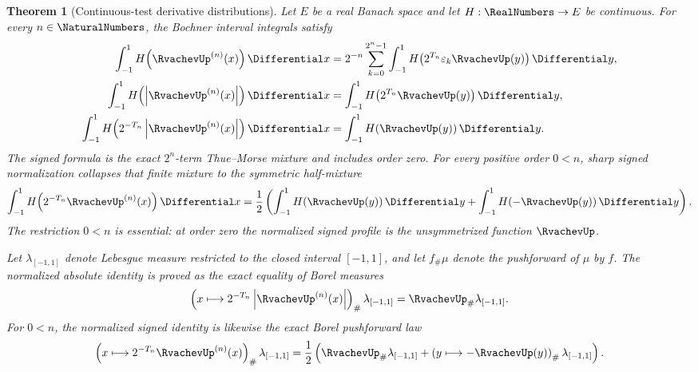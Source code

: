 \documentclass[11pt,oneside]{article}
\newtheorem{theorem}{Theorem}[section]
\theoremstyle{definition}
\theoremstyle{remark}
\begin{document}
\begin{theorem}[Continuous-test derivative distributions]
\label{thm:rvachev-derivative-continuous-tests}
Let \(E\) be a real Banach space and let \(H:\RealNumbers\to E\) be continuous.  For every
\(n\in\NaturalNumbers\), the Bochner interval integrals satisfy
\begin{align}
 \int_{-1}^{1}H\!\left(\RvachevUp^{(n)}(x)\right)\Differential x
 &=
 2^{-n}\sum_{k=0}^{2^n-1}
 \int_{-1}^{1}H\!\left(2^{T_n}\varepsilon_k\RvachevUp(y)\right)\Differential y,
                                                               \label{eq:rvachev-signed-mixture}\\
 \int_{-1}^{1}H\!\left(\left|\RvachevUp^{(n)}(x)\right|\right)\Differential x
 &=
 \int_{-1}^{1}H\!\left(2^{T_n}\RvachevUp(y)\right)\Differential y,
                                                               \label{eq:rvachev-absolute-test}\\
 \int_{-1}^{1}H\!\left(2^{-T_n}\left|\RvachevUp^{(n)}(x)\right|\right)\Differential x
 &=
 \int_{-1}^{1}H\!\left(\RvachevUp(y)\right)\Differential y.                    \label{eq:rvachev-normalized-test}
\end{align}
The signed formula is the exact \(2^n\)-term Thue--Morse mixture and includes order zero.
For every positive order \(0<n\), sharp signed normalization collapses that finite
mixture to the symmetric half-mixture
\begin{equation}
 \int_{-1}^{1}H\!\left(2^{-T_n}\RvachevUp^{(n)}(x)\right)\Differential x
 =\frac12\left(
   \int_{-1}^{1}H\!\left(\RvachevUp(y)\right)\Differential y
   +\int_{-1}^{1}H\!\left(-\RvachevUp(y)\right)\Differential y
  \right).                                             \label{eq:rvachev-normalized-signed-test}
\end{equation}
The restriction \(0<n\) is essential: at order zero the normalized signed profile is
the unsymmetrized function \(\RvachevUp\).

Let \(\lambda_{[-1,1]}\) denote Lebesgue measure restricted to the closed interval
\([-1,1]\), and let \(f_{\#}\mu\) denote the pushforward of \(\mu\) by \(f\).
The normalized absolute identity is proved as the exact equality of Borel measures
\begin{equation}
 \left(x\longmapsto
 2^{-T_n}\left|\RvachevUp^{(n)}(x)\right|\right)_{\#}\lambda_{[-1,1]}
 =
 \RvachevUp_{\#}\lambda_{[-1,1]}.                                \label{eq:rvachev-absolute-pushforward}
\end{equation}
For \(0<n\), the normalized signed identity is likewise the exact Borel pushforward law
\begin{equation}
 \left(x\longmapsto
 2^{-T_n}\RvachevUp^{(n)}(x)\right)_{\#}\lambda_{[-1,1]}
 =\frac12\left(
   \RvachevUp_{\#}\lambda_{[-1,1]}
   +\left(y\longmapsto-\RvachevUp(y)\right)_{\#}\lambda_{[-1,1]}
  \right).                                             \label{eq:rvachev-normalized-signed-pushforward}
\end{equation}
\end{theorem}
\end{document}
